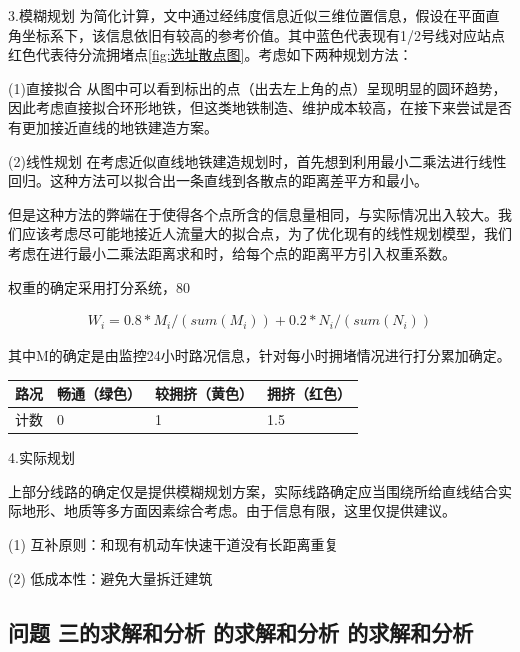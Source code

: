 \documentclass[12pt,a4paper]{mcmthesis}
\begin{document}
    3.模糊规划
    为简化计算，文中通过经纬度信息近似三维位置信息，假设在平面直角坐标系下，该信息依旧有较高的参考价值。其中蓝色代表现有1/2号线对应站点红色代表待分流拥堵点\ref{fig:选址散点图}。考虑如下两种规划方法：

    (1)直接拟合
    从图中可以看到标出的点（出去左上角的点）呈现明显的圆环趋势，因此考虑直接拟合环形地铁，但这类地铁制造、维护成本较高，在接下来尝试是否有更加接近直线的地铁建造方案。

    (2)线性规划
    在考虑近似直线地铁建造规划时，首先想到利用最小二乘法进行线性回归。这种方法可以拟合出一条直线到各散点的距离差平方和最小。

    但是这种方法的弊端在于使得各个点所含的信息量相同，与实际情况出入较大。我们应该考虑尽可能地接近人流量大的拟合点，为了优化现有的线性规划模型，我们考虑在进行最小二乘法距离求和时，给每个点的距离平方引入权重系数。

    权重的确定采用打分系统，80%

    \begin{equation}
        \begin{aligned}
            W_i=0.8*M_i/(sum(M_i))+0.2*N_i/(sum(N_i))
        \end{aligned}
    \end{equation}

    其中M的确定是由监控24小时路况信息，针对每小时拥堵情况进行打分累加确定。

    \begin{table}
        \centering
        \begin{tabular}{|l|l|l|l|}
            \hline
            路况 & 畅通（绿色） & 较拥挤（黄色） & 拥挤（红色） \\ \hline
            计数 & 0      & 1       & 1.5    \\ \hline
        \end{tabular}
    \end{table}



    4.实际规划

    上部分线路的确定仅是提供模糊规划方案，实际线路确定应当围绕所给直线结合实际地形、地质等多方面因素综合考虑。由于信息有限，这里仅提供建议。

    (1)    互补原则：和现有机动车快速干道没有长距离重复

    (2)    低成本性：避免大量拆迁建筑


    \subsection{问题 三的求解和分析 的求解和分析 的求解和分析}
\end{document}
